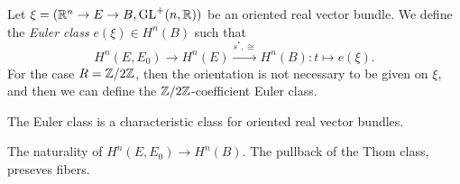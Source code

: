 \documentclass{../../../small}
\begin{document}
\begin{defn*}[4.7]
Let $\xi=(\mathbb{R}^n\to E\to B,\mathrm{GL}^+(n,\mathbb{R}))$ be an oriented real vector bundle.
We define the \emph{Euler class} $e(\xi)\in H^n(B)$ such that \[H^n(E,E_0)\to H^n(E)\xrightarrow{s^*,\cong}H^n(B):t\mapsto e(\xi).\]
For the case $R=\mathbb{Z}/2\mathbb{Z}$, then the orientation is not necessary to be given on $\xi$, and then we can define the $\mathbb{Z}/2\mathbb{Z}$-coefficient Euler class.
\end{defn*}

\begin{thm*}[4.8]
The Euler class is a characteristic class for oriented real vector bundles.
\end{thm*}
\begin{pf}
The naturality of $H^n(E,E_0)\to H^n(B)$.
The pullback of the Thom class, preseves fibers.
\end{pf}
\end{document}
